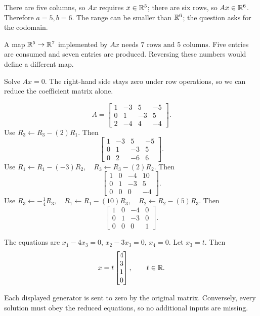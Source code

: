 There are five columns, so $Ax$ requires $x\in\mathbb{R}^5$; there are
six rows, so $Ax\in\mathbb{R}^6$. Therefore $\boxed{a=5,b=6}$.
The range can be smaller than $\mathbb{R}^6$; the question asks for the codomain.

A map $\mathbb{R}^5\to\mathbb{R}^7$ implemented by $Ax$ needs $\boxed{7\text{ rows
and }5\text{ columns}}$. Five entries are consumed and seven entries
are produced. Reversing these numbers would define a different map.



\goal Solve $Ax=0$. The right-hand side stays zero under row operations, so we can reduce the coefficient matrix alone.

\[ A=\begin{bmatrix}1 & -3 & 5 & -5\\0 & 1 & -3 & 5\\2 & -4 & 4 & -4\end{bmatrix}.\]
Use $R_{3}\leftarrow R_{3}-(2)R_{1}$. Then
\[ \begin{bmatrix}1 & -3 & 5 & -5\\0 & 1 & -3 & 5\\0 & 2 & -6 & 6\end{bmatrix}.\]
Use $R_{1}\leftarrow R_{1}-(-3)R_{2},\quad R_{3}\leftarrow R_{3}-(2)R_{2}$. Then
\[ \begin{bmatrix}1 & 0 & -4 & 10\\0 & 1 & -3 & 5\\0 & 0 & 0 & -4\end{bmatrix}.\]
Use $R_{3}\leftarrow - \frac{1}{4}R_{3},\quad R_{1}\leftarrow R_{1}-(10)R_{3},\quad R_{2}\leftarrow R_{2}-(5)R_{3}$. Then
\[ \begin{bmatrix}1 & 0 & -4 & 0\\0 & 1 & -3 & 0\\0 & 0 & 0 & 1\end{bmatrix}.\]

The equations are $x_1-4x_3=0$, $x_2-3x_3=0$, $x_4=0$. Let $x_3=t$. Then
\[ x=t\begin{bmatrix}4\\3\\1\\0\end{bmatrix},\qquad t\in\mathbb{R}.\]

Each displayed generator is sent to zero by the original matrix. Conversely, every solution must obey the reduced equations, so no additional inputs are missing.


